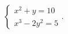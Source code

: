 $\displaystyle
\left\{
\begin{array}{l}
\displaystyle x^2 + y = 10 \\
\displaystyle x^3 - 2y^2 = 5
\end{array}
\right.
$.
